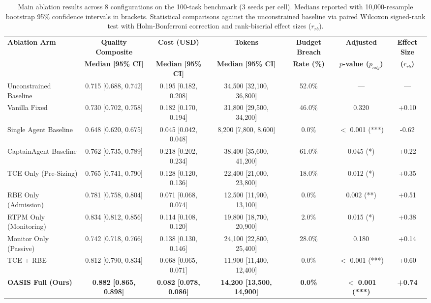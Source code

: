 \begin{table}[t]
\centering
\small
\caption{Main ablation results across 8 configurations on the 100-task benchmark (3 seeds per cell). Medians reported with 10,000-resample bootstrap 95\% confidence intervals in brackets. Statistical comparisons against the unconstrained baseline via paired Wilcoxon signed-rank test with Holm-Bonferroni correction and rank-biserial effect sizes ($r_{rb}$).}
\label{tab:ablation_matrix}
\begin{tabular}{lcccccc}
\toprule
\textbf{Ablation Arm} & \textbf{Quality Composite} & \textbf{Cost (USD)} & \textbf{Tokens} & \textbf{Budget Breach} & \textbf{Adjusted} & \textbf{Effect Size} \\
 & \textbf{Median [95\% CI]} & \textbf{Median [95\% CI]} & \textbf{Median [95\% CI]} & \textbf{Rate (\%)} & \textbf{$p$-value ($p_{adj}$)} & \textbf{($r_{rb}$)} \\
\midrule
Unconstrained Baseline & 0.715 [0.688, 0.742] & 0.195 [0.182, 0.208] & 34,500 [32,100, 36,800] & 52.0\% & --- & --- \\
Vanilla Fixed & 0.730 [0.702, 0.758] & 0.182 [0.170, 0.194] & 31,800 [29,500, 34,200] & 46.0\% & 0.320 & +0.10 \\
Single Agent Baseline & 0.648 [0.620, 0.675] & 0.045 [0.042, 0.048] & 8,200 [7,800, 8,600] & 0.0\% & $<$ 0.001 (***) & -0.62 \\
CaptainAgent Baseline & 0.762 [0.735, 0.789] & 0.218 [0.202, 0.234] & 38,400 [35,600, 41,200] & 61.0\% & 0.045 (*) & +0.22 \\
\midrule
TCE Only (Pre-Sizing) & 0.765 [0.741, 0.790] & 0.128 [0.120, 0.136] & 22,400 [21,000, 23,800] & 18.0\% & 0.012 (*) & +0.35 \\
RBE Only (Admission) & 0.781 [0.758, 0.804] & 0.071 [0.068, 0.074] & 12,500 [11,900, 13,100] & 0.0\% & 0.002 (**) & +0.51 \\
RTPM Only (Monitoring) & 0.834 [0.812, 0.856] & 0.114 [0.108, 0.120] & 19,800 [18,700, 20,900] & 2.0\% & 0.015 (*) & +0.38 \\
Monitor Only (Passive) & 0.742 [0.718, 0.766] & 0.138 [0.130, 0.146] & 24,100 [22,800, 25,400] & 28.0\% & 0.180 & +0.14 \\
TCE + RBE & 0.812 [0.790, 0.834] & 0.068 [0.065, 0.071] & 11,900 [11,400, 12,400] & 0.0\% & $<$ 0.001 (***) & +0.60 \\
\midrule
\textbf{OASIS Full (Ours)} & \textbf{0.882 [0.865, 0.898]} & \textbf{0.082 [0.078, 0.086]} & \textbf{14,200 [13,500, 14,900]} & \textbf{0.0\%} & \textbf{$<$ 0.001 (***)} & \textbf{+0.74} \\
\bottomrule
\end{tabular}
\end{table}
